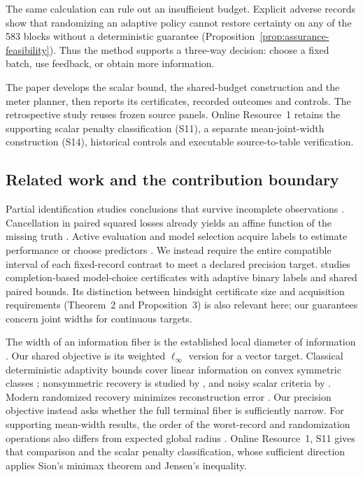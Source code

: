 \documentclass[12pt]{article}
\begin{document}
The same calculation can rule out an insufficient budget. Explicit adverse
records show that randomizing an adaptive policy cannot restore certainty
on any of the 583 blocks without a deterministic guarantee
(Proposition~\ref{prop:assurance-feasibility}). Thus the method supports a
three-way decision: choose a fixed batch, use feedback, or obtain more
information.

The paper develops the scalar bound, the shared-budget construction and the
meter planner, then reports its certificates, recorded outcomes and controls.
The retrospective study reuses frozen source panels. Online Resource~1
retains the supporting scalar penalty classification (S11), a separate
mean-joint-width construction (S14), historical controls and executable
source-to-table verification.

\subsection{Related work and the contribution boundary}
Partial identification studies conclusions that survive incomplete
observations \citep{manski,polo}. Cancellation in paired squared losses
already yields an affine function of the missing truth \citep{patton}.
Active evaluation and model selection acquire labels to estimate performance
or choose predictors \citep{sawade,hara,active,okanovic2025}. We instead
require the entire compatible interval of each fixed-record contrast to
meet a declared precision target. \citet[Theorem~1 and Proposition~1]{kuboyama2026}
studies completion-based model-choice certificates with adaptive binary
labels and shared paired bounds. Its distinction between hindsight certificate
size and acquisition requirements (Theorem~2 and Proposition~3) is also
relevant here; our guarantees concern joint widths for continuous targets.

The width of an information fiber is the established local diameter of
information \citep[Section~4.1]{novak2008}. Our shared objective is its
weighted $\ell_\infty$ version for a vector target. Classical deterministic
adaptivity bounds cover linear information on convex symmetric classes
\citep[Theorems~4.4--4.5]{novak2008}; nonsymmetric recovery is studied by
\citet{novak1995}, and noisy scalar criteria by
\citet[Theorems~2--3 and~5]{osipenko}. Modern randomized recovery minimizes
reconstruction error \citep[Section~2 and Proposition~4.1]{krieg2025}
\citep[Section~9.1, Eq.~(9.15), author manuscript v2]{krieg2026}.
Our precision objective instead asks whether the full terminal fiber is
sufficiently narrow. For supporting mean-width results, the order of the
worst-record and randomization operations also differs from expected global
radius \citep[Eq.~(2.4), Remark~6.1, author manuscript v2]{krieg2026}.
Online Resource~1, S11 gives that comparison and the scalar penalty
classification, whose sufficient direction applies Sion's minimax theorem
\citep[Theorem~3.4]{sion1958} and Jensen's inequality.
\end{document}
